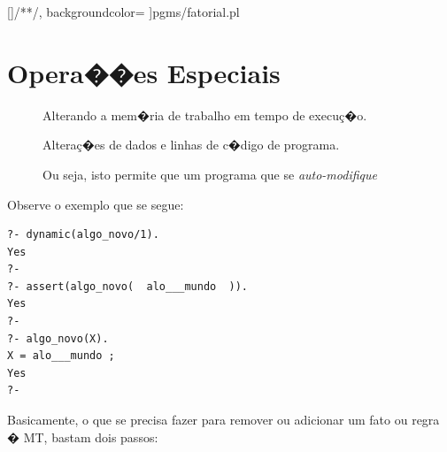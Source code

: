 \documentclass[final,a4paper]{article}
\begin{document}
[\color{blue}]{/*}{*/}, %
           backgroundcolor=\color{yellow}  %
		 ]{pgms/fatorial.pl}


\newpage
\section{Opera��es Especiais}

\begin{description}

\item [] Alterando a mem�ria de trabalho em tempo 
de execu\c{c}�o. 

\item [] Altera\c{c}�es de dados e linhas de c�digo
de programa.

\item [] Ou seja, isto permite que
 um programa que se {\em auto-modifique}
 
\end{description}

Observe o exemplo que se segue:
{\small
\begin{verbatim}
?- dynamic(algo_novo/1).
Yes
?-
?- assert(algo_novo(  alo___mundo  )).
Yes
?-
?- algo_novo(X).
X = alo___mundo ;
Yes
?-
\end{verbatim}
}

\newpage
Basicamente, o que se precisa fazer para
remover ou adicionar um fato ou regra � MT,
bastam dois passos:
\end{document}
